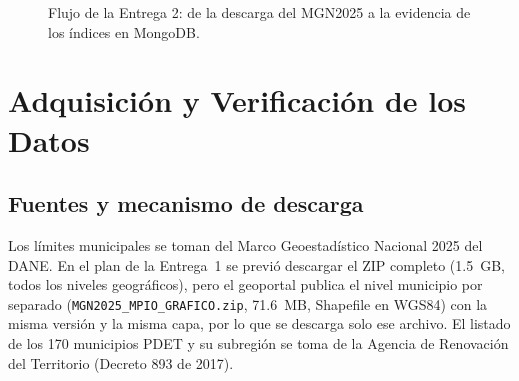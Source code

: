 \documentclass[12pt, letterpaper]{article}
\begin{document}
\begin{figure}[H]
\centering
{}
\caption{Flujo de la Entrega 2: de la descarga del MGN2025 a la evidencia de los índices en MongoDB.}
\label{fig:flujo}
\end{figure}

\newpage

\section{Adquisición y Verificación de los Datos}

\subsection{Fuentes y mecanismo de descarga}
Los límites municipales se toman del Marco Geoestadístico Nacional 2025 del DANE. En el plan de la Entrega~1 se previó descargar el ZIP completo (1.5~GB, todos los niveles geográficos), pero el geoportal publica el nivel municipio por separado (\texttt{MGN2025\_MPIO\_GRAFICO.zip}, 71.6~MB, Shapefile en WGS84) con la misma versión y la misma capa, por lo que se descarga solo ese archivo. El listado de los 170 municipios PDET y su subregión se toma de la Agencia de Renovación del Territorio (Decreto 893 de 2017).
\end{document}
